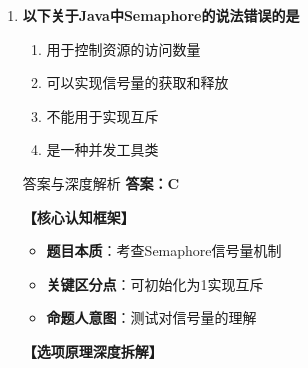 \documentclass[12pt, a4paper]{ctexart}
\begin{document}
\begin{enumerate}[label=\textbf{\arabic*.}]
\begin{bluebox}{答案与深度解析}
\begin{itemize}[label={}, leftmargin=*, nosep]
		      \end{itemize}

		      \textbf{【应背诵知识点（命题人思维版）】}
		      \begin{enumerate}[label={}, leftmargin=*, nosep]
			      \item \textbf{CyclicBarrier特点}：
			            \begin{itemize}[label={}, nosep]
				            \item 可循环使用
				            \item 设置线程数量
				            \item 线程相互等待
			            \end{itemize}
		      \end{enumerate}

		      \textbf{【命题趋势与实战策略】}

		      \textbf{考场秒杀技巧}：CyclicBarrier = 可循环 + 相互等待
	      \end{bluebox}

	\item \textbf{以下关于Java中Semaphore的说法错误的是}
	      \begin{enumerate}[label=\Alph*.]
		      \item 用于控制资源的访问数量
		      \item 可以实现信号量的获取和释放
		      \item 不能用于实现互斥
		      \item 是一种并发工具类
	      \end{enumerate}

	      \begin{bluebox}{答案与深度解析}
		      \textbf{答案：C}

		      \textbf{【核心认知框架】}
		      \begin{itemize}[label={}, leftmargin=*, nosep]
			      \item \textbf{题目本质}：考查Semaphore信号量机制
			      \item \textbf{关键区分点}：可初始化为1实现互斥
			      \item \textbf{命题人意图}：测试对信号量的理解
		      \end{itemize}

		      \textbf{【选项原理深度拆解】}
					  \begin{itemize}[label={}, leftmargin=*, nosep]


\end{itemize}
\end{bluebox}
\end{enumerate}
\end{document}
